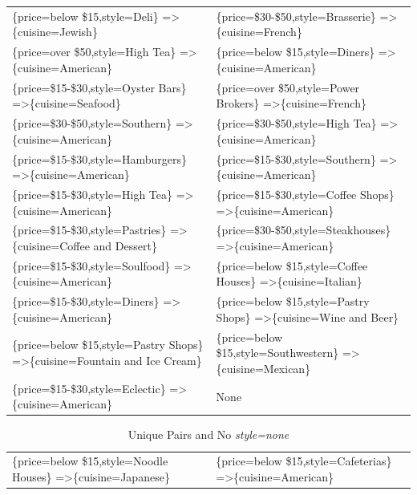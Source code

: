 \documentclass[letterpaper,10pt]{article}
\begin{document}
\begin{appendices}
\begin{table}[h]
\begin{adjustbox}{max width=\textwidth}
\begin{tabular}{ll}
\{price=below \$15,style=Deli\} =\textgreater \{cuisine=Jewish\} & \{price=\$30-\$50,style=Brasserie\} =\textgreater \{cuisine=French\} \\ 
\{price=over \$50,style=High Tea\} =\textgreater \{cuisine=American\} & \{price=below \$15,style=Diners\} =\textgreater \{cuisine=American\} \\ 
\{price=\$15-\$30,style=Oyster Bars\} =\textgreater \{cuisine=Seafood\} & \{price=over \$50,style=Power Brokers\} =\textgreater \{cuisine=French\} \\ 
\{price=\$30-\$50,style=Southern\} =\textgreater \{cuisine=American\} & \{price=\$30-\$50,style=High Tea\} =\textgreater \{cuisine=American\} \\ 
\{price=\$15-\$30,style=Hamburgers\} =\textgreater \{cuisine=American\} & \{price=\$15-\$30,style=Southern\} =\textgreater \{cuisine=American\} \\ 
\{price=\$15-\$30,style=High Tea\} =\textgreater \{cuisine=American\} & \{price=\$15-\$30,style=Coffee Shops\} =\textgreater \{cuisine=American\} \\ 
\{price=\$15-\$30,style=Pastries\} =\textgreater \{cuisine=Coffee and Dessert\} & \{price=\$30-\$50,style=Steakhouses\} =\textgreater \{cuisine=American\} \\ 
\{price=\$15-\$30,style=Soulfood\} =\textgreater \{cuisine=American\} & \{price=below \$15,style=Coffee Houses\} =\textgreater \{cuisine=Italian\} \\ 
\{price=\$15-\$30,style=Diners\} =\textgreater \{cuisine=American\} & \{price=below \$15,style=Pastry Shops\} =\textgreater \{cuisine=Wine and Beer\} \\ 
\{price=below \$15,style=Pastry Shops\} =\textgreater \{cuisine=Fountain and Ice Cream\} & \{price=below \$15,style=Southwestern\} =\textgreater \{cuisine=Mexican\} \\ 
\{price=\$15-\$30,style=Eclectic\} =\textgreater \{cuisine=American\} & None \\ 
\end{tabular}
\end{adjustbox}
\end{table}
\begin{table}[h]
\caption*{Unique Pairs and No \textit{style=none}}
\begin{adjustbox}{max width=\textwidth}
\begin{tabular}{ll}
\{price=below \$15,style=Noodle Houses\} =\textgreater \{cuisine=Japanese\} & \{price=below \$15,style=Cafeterias\} =\textgreater \{cuisine=American\} \\ 

\end{tabular}
\end{adjustbox}
\end{table}
\end{appendices}
\end{document}
